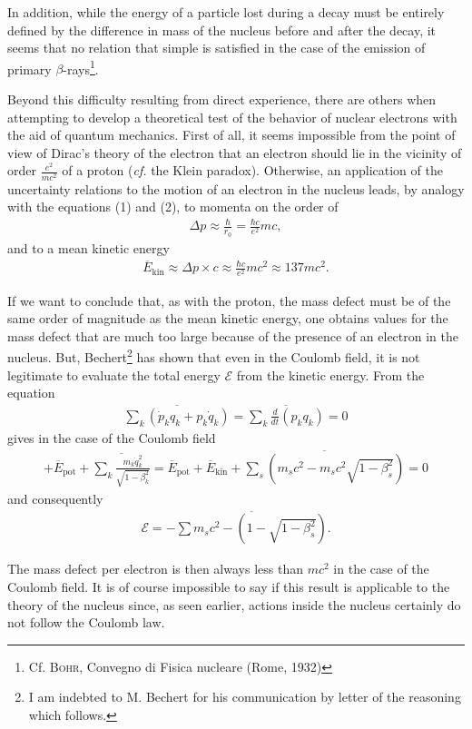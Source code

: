 \documentclass[a4paper,11pt]{article}
\newcommand{\?}[2]{#1\footnote{\textsc{Translator note}: #2}}
\newcommand{\nequ}[2]{\begin{align*}\tag{#1}#2\end{align*}}
\newcommand{\uequ}[1]{\begin{align*}#1\end{align*}}
\newcommand{\dXdY}[2]{\frac{d{#1}}{{d{#2}}}}
\newcommand{\citeauthor}[1]{\textsc{#1}}
\newcommand{\citepub}[1]{#1}
\newcommand{\citeyear}[1]{#1}
\begin{document}
In addition, while the energy of a particle lost during a decay must be entirely defined by the difference in mass of the nucleus before and after the decay, it seems that no relation that simple is satisfied in the case of the emission of primary $\beta$-rays\footnote{Cf. \citeauthor{Bohr}, \citepub{Convegno di Fisica nucleare} (Rome, \citeyear{1932})}.

Beyond this difficulty resulting from direct experience, there are others when attempting to develop a theoretical test of the behavior of nuclear electrons with the aid of quantum mechanics. First of all, it seems impossible from the point of view of Dirac's theory of the electron that an electron should lie in the vicinity of order $\frac{e^2}{mc^2}$ of a proton (\textit{cf.} the Klein paradox). Otherwise, an application of the uncertainty relations to the motion of an electron in the nucleus leads, by analogy with the equations (1) and (2), to momenta on the order of 
\nequ{3}{
\Delta p \approx \frac{\hbar}{r_0} = \frac{\hbar c}{e^2}mc,
}
and to a mean kinetic energy
\nequ{4}{
\overline{E}_\text{kin} \approx \Delta p\times c \approx 
\frac{\hbar c}{e^2}mc^2 \approx 137 mc^2.
}

If we want to conclude that, as with the proton, the mass defect must be of the same order of magnitude as the mean kinetic energy, one obtains values for the mass defect that are much too large because of the presence of an electron in the nucleus. But, Bechert\footnote{I am indebted to M. Bechert for his communication by letter of the reasoning which follows.} has shown that even in the Coulomb field, it is not legitimate to evaluate the total energy $\mathcal{E}$ from the kinetic energy. From the equation
\nequ{5}{
\overline{\sum\limits_k(\dot{p}_k q_k + p_k\dot{q}_k)} = 
\overline{\sum\limits_k\dXdY{}{t}(p_k q_k)} = 0
}
gives in the case of the Coulomb field
\uequ{
+\overline{E}_\text{pot} + \overline{\sum\limits_k\frac{m_k \dot{q}_k^2}{\sqrt{1-\beta_k^2}}} = \overline{E}_\text{pot} + \overline{E}_\text{kin}
+\overline{\sum\limits_s\left(m_s c^2 - m_s c^2 \sqrt{1-\beta_s^2}\right)} = 0
}
and consequently
\nequ{6}{
\mathcal{E} = -\overline{\sum m_s c^2 - \left(1- \sqrt{1-\beta_s^2}\right)}.
}

The mass defect per electron is then always less than $mc^2$ in the case of the Coulomb field. It is of course impossible to say if this result is applicable to the theory of the nucleus since, as seen earlier, actions inside the nucleus certainly do not follow the Coulomb law.
\end{document}
